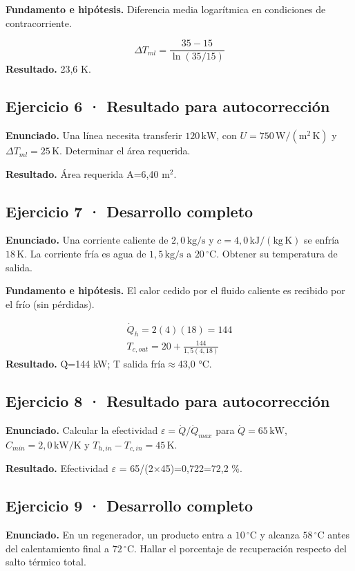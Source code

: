 \documentclass[11pt,a4paper]{article}
\begin{document}
\textbf{Fundamento e hipótesis.} Diferencia media logarítmica en condiciones de contracorriente.

\[
\Delta T_{ml}=\frac{35-15}{\ln(35/15)}
\]
\textbf{Resultado.} 23,6 K.


\subsection*{Ejercicio 6 · Resultado para autocorrección}
\textbf{Enunciado.} Una línea necesita transferir \(120\,\mathrm{kW}\), con \(U=750\,\mathrm{W/(m^2\,K)}\) y \(\Delta T_{ml}=25\,\mathrm K\). Determinar el área requerida.

\textbf{Resultado.} Área requerida A=6,40 m\ensuremath{^2}.


\subsection*{Ejercicio 7 · Desarrollo completo}
\textbf{Enunciado.} Una corriente caliente de \(2{,}0\,\mathrm{kg/s}\) y \(c=4{,}0\,\mathrm{kJ/(kg\,K)}\) se enfría \(18\,\mathrm K\). La corriente fría es agua de \(1{,}5\,\mathrm{kg/s}\) a \(20\,^\circ\mathrm C\). Obtener su temperatura de salida.

\textbf{Fundamento e hipótesis.} El calor cedido por el fluido caliente es recibido por el frío (sin pérdidas).

\[
\begin{gathered}
\dot Q_h=2(4)(18)=144\\T_{c,out}=20+\frac{144}{1{,}5(4{,}18)}
\end{gathered}
\]
\textbf{Resultado.} Q̇=144 kW; T salida fría\ensuremath{\approx}43,0 °C.


\subsection*{Ejercicio 8 · Resultado para autocorrección}
\textbf{Enunciado.} Calcular la efectividad \(\varepsilon=\dot Q/\dot Q_{max}\) para \(\dot Q=65\,\mathrm{kW}\), \(C_{min}=2{,}0\,\mathrm{kW/K}\) y \(T_{h,in}-T_{c,in}=45\,\mathrm K\).

\textbf{Resultado.} Efectividad \ensuremath{\varepsilon} = 65/(2\ensuremath{\times}45)=0,722=72,2 \%.


\subsection*{Ejercicio 9 · Desarrollo completo}
\textbf{Enunciado.} En un regenerador, un producto entra a \(10\,^\circ\mathrm C\) y alcanza \(58\,^\circ\mathrm C\) antes del calentamiento final a \(72\,^\circ\mathrm C\). Hallar el porcentaje de recuperación respecto del salto térmico total.
\end{document}

